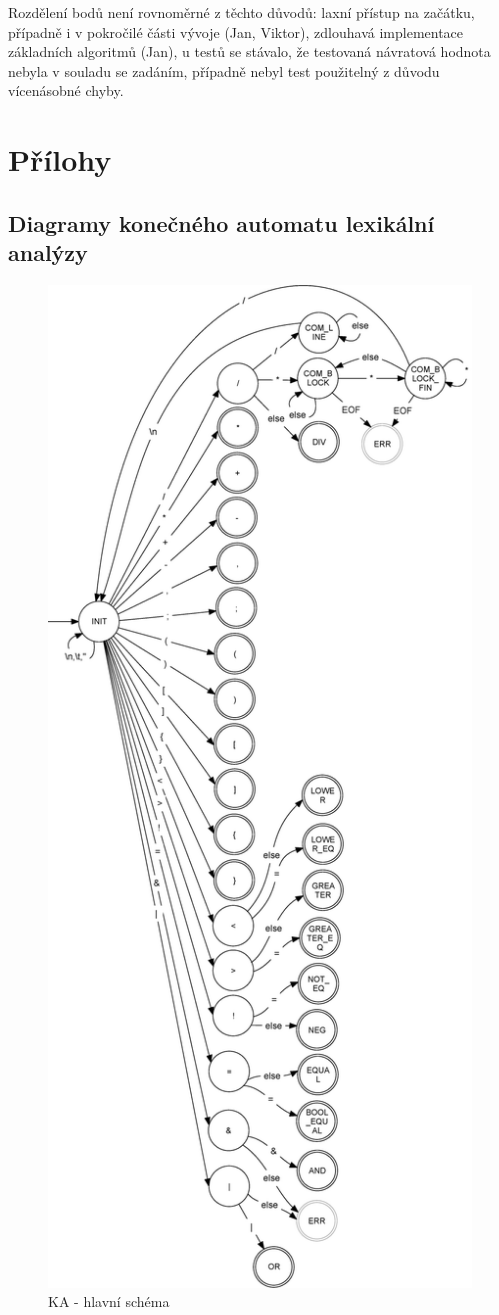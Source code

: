 \documentclass[a4paper,11pt]{article}
\begin{document}
Rozdělení bodů není rovnoměrné z těchto důvodů: laxní přístup na začátku, případně i v pokročilé části vývoje (Jan, Viktor), zdlouhavá implementace základních algoritmů (Jan), u testů se stávalo, že testovaná návratová hodnota nebyla v souladu se zadáním, případně nebyl test použitelný z důvodu vícenásobné chyby. 

\section{Přílohy}
\subsection{Diagramy konečného automatu lexikální analýzy}
\label{diag:LA-FSM}
\begin{figure}[H]
	\centering
	\includegraphics[scale=.31]{FSM_MAIN.eps}
	\caption{KA - hlavní schéma}
\end{figure}
\end{document}
